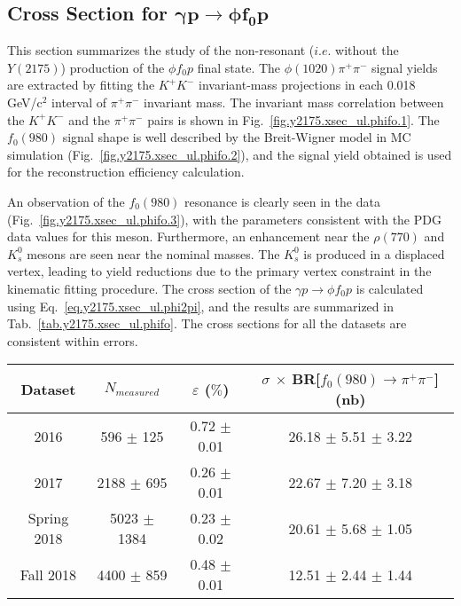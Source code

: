 \newpage
\subsection{Cross Section for \texorpdfstring{$\bm{\gamma p \rightarrow \phi f_0 p}$}{}}
\label{chap.y2175.xsec_ul.phifo}

This section summarizes the study of the non-resonant ($i.e.$ without the $Y(2175)$) production of the $\phi f_0 p$ final state. The $\phi(1020)\pi^{+}\pi^{-}$ signal yields are extracted by fitting the $K^{+}K^{-}$ invariant-mass projections in each 0.018 GeV/c$^{2}$ interval of $\pi^{+}\pi^{-}$ invariant mass. The invariant mass correlation between the $K^{+}K^{-}$ and the $\pi^{+}\pi^{-}$ pairs is shown in Fig.~\ref{fig.y2175.xsec_ul.phifo.1}. The $f_{0}(980)$ signal shape is well described by the Breit-Wigner model in MC simulation (Fig.~\ref{fig.y2175.xsec_ul.phifo.2}), and the signal yield obtained is used for the reconstruction efficiency calculation.
~\par An observation of the $f_{0}(980)$ resonance is clearly seen in the data (Fig.~\ref{fig.y2175.xsec_ul.phifo.3}), with the parameters consistent with the PDG data values for this meson. Furthermore, an enhancement near the $\rho(770)$ and $K_{s}^{0}$ mesons are seen near the nominal masses. The $K_{s}^{0}$ is produced in a displaced vertex, leading to yield reductions due to the primary vertex constraint in the kinematic fitting procedure. The cross section of the $\gamma p \rightarrow \phi f_0 p$ is calculated using Eq.~\ref{eq.y2175.xsec_ul.phi2pi}, and the results are summarized in Tab.~\ref{tab.y2175.xsec_ul.phifo}. The cross sections for all the datasets are consistent within errors.

\begin{table*}[!b]
    \centering
    \caption{A summary of the total cross section and efficiency for $\gamma p \rightarrow \phi f_0 p$. The statistical and systematics errors are displayed for the cross section. The systematic uncertainties will be discussed in Sec.~\ref{chap.y2175.syserr}}
    \label{tab.y2175.xsec_ul.phifo}
    \begin{tabular}{|c|c|c|c|}
        \hline
        Dataset & $N_{measured}$ & $\varepsilon$ ($\%$) & $\sigma$ $\times$ BR[$f_0(980) \rightarrow \pi^{+} \pi^{-}$] (nb) \\
        \hline
        2016 & 596 $\pm$ 125 & 0.72 $\pm$ 0.01 & 26.18 $\pm$ 5.51 $\pm$ 3.22 \\
        2017 & 2188 $\pm$ 695 & 0.26 $\pm$ 0.01 & 22.67 $\pm$ 7.20 $\pm$ 3.18 \\
        Spring 2018 & 5023 $\pm$ 1384 & 0.23 $\pm$ 0.02 & 20.61 $\pm$ 5.68 $\pm$ 1.05 \\
        Fall 2018 & 4400 $\pm$ 859 & 0.48 $\pm$ 0.01 & 12.51 $\pm$ 2.44 $\pm$ 1.44 \\
        \hline
    \end{tabular}
\end{table*}

